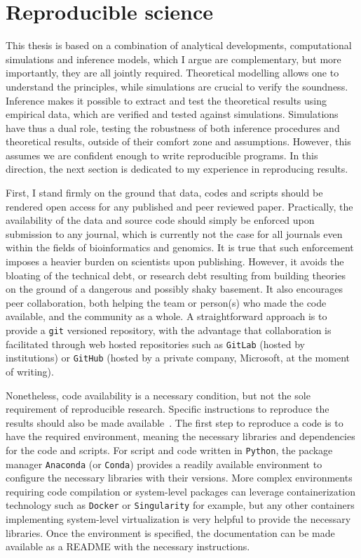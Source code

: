 \section{Reproducible science}
\label{sec:reproducible-science}

This thesis is based on a combination of analytical developments, computational simulations and inference models, which I argue are complementary, but more importantly, they are all jointly required.
Theoretical modelling allows one to understand the principles, while simulations are crucial to verify the soundness.
Inference makes it possible to extract and test the theoretical results using empirical data, which are verified and tested against simulations.
Simulations have thus a dual role, testing the robustness of both inference procedures and theoretical results, outside of their comfort zone and assumptions.
However, this assumes we are confident enough to write reproducible programs.
In this direction, the next section is dedicated to my experience in reproducing results.

First, I stand firmly on the ground that data, codes and scripts should be rendered open access for any published and peer reviewed paper.
Practically, the availability of the data and source code should simply be enforced upon submission to any journal, which is currently not the case for all journals even within the fields of bioinformatics and genomics.
It is true that such enforcement imposes a heavier burden on scientists upon publishing.
However, it avoids the bloating of the technical debt, or research debt resulting from building theories on the ground of a dangerous and possibly shaky basement.
It also encourages peer collaboration, both helping the team or person(s) who made the code available, and the community as a whole.
A straightforward approach is to provide a \texttt{git} versioned repository, with the advantage that collaboration is facilitated through web hosted repositories such as \texttt{GitLab} (hosted by institutions) or \texttt{GitHub} (hosted by a private company, Microsoft, at the moment of writing).

Nonetheless, code availability is a necessary condition, but not the sole requirement of reproducible research.
Specific instructions to reproduce the results should also be made available~\citep{Wilson2014,Darriba2018}.
The first step to reproduce a code is to have the required environment, meaning the necessary libraries and dependencies for the code and scripts.
For script and code written in \texttt{Python}, the package manager \texttt{Anaconda} (or \texttt{Conda}) provides a readily available environment to configure the necessary libraries with their versions.
More complex environments requiring code compilation or system-level packages can leverage containerization technology such as \texttt{Docker} or \texttt{Singularity} for example, but any other containers implementing system-level virtualization is very helpful to provide the necessary libraries.
Once the environment is specified, the documentation can be made available as a README with the necessary instructions.

